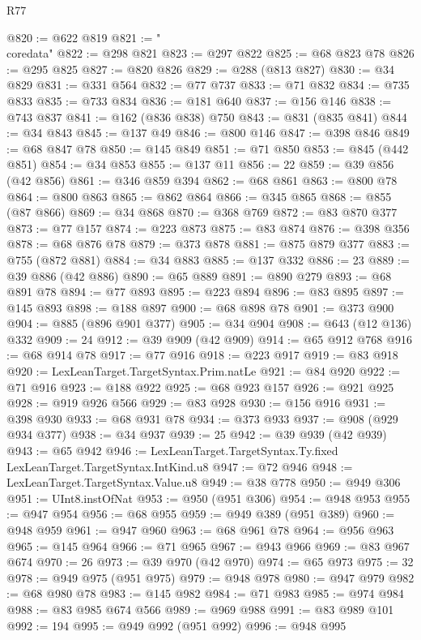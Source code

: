 \begin{lexlean}{R77}
\begin{coremodule}
{{@820 := @622 @819
@821 := "\\coredata"
@822 := @298 @821
@823 := @297 @822
@825 := @68 @823 @78
@826 := @295 @825
@827 := @820 @826
@829 := @288 (@813 @827)
@830 := @34 @829
@831 := @331 @564
@832 := @77 @737
@833 := @71 @832
@834 := @735 @833
@835 := @733 @834
@836 := @181 @640
@837 := @156 @146
@838 := @743 @837
@841 := @162 (@836 @838) @750
@843 := @831 (@835 @841)
@844 := @34 @843
@845 := @137 @49
@846 := @800 @146
@847 := @398 @846
@849 := @68 @847 @78
@850 := @145 @849
@851 := @71 @850
@853 := @845 (@442 @851)
@854 := @34 @853
@855 := @137 @11
@856 := 22
@859 := @39 @856 (@42 @856)
@861 := @346 @859 @394
@862 := @68 @861
@863 := @800 @78
@864 := @800 @863
@865 := @862 @864
@866 := @345 @865
@868 := @855 (@87 @866)
@869 := @34 @868
@870 := @368 @769
@872 := @83 @870 @377
@873 := @77 @157
@874 := @223 @873
@875 := @83 @874
@876 := @398 @356
@878 := @68 @876 @78
@879 := @373 @878
@881 := @875 @879 @377
@883 := @755 (@872 @881)
@884 := @34 @883
@885 := @137 @332
@886 := 23
@889 := @39 @886 (@42 @886)
@890 := @65 @889
@891 := @890 @279
@893 := @68 @891 @78
@894 := @77 @893
@895 := @223 @894
@896 := @83 @895
@897 := @145 @893
@898 := @188 @897
@900 := @68 @898 @78
@901 := @373 @900
@904 := @885 (@896 @901 @377)
@905 := @34 @904
@908 := @643 (@12 @136) @332
@909 := 24
@912 := @39 @909 (@42 @909)
@914 := @65 @912 @768
@916 := @68 @914 @78
@917 := @77 @916
@918 := @223 @917
@919 := @83 @918
@920 := LexLeanTarget.TargetSyntax.Prim.natLe
@921 := @84 @920
@922 := @71 @916
@923 := @188 @922
@925 := @68 @923 @157
@926 := @921 @925
@928 := @919 @926 @566
@929 := @83 @928
@930 := @156 @916
@931 := @398 @930
@933 := @68 @931 @78
@934 := @373 @933
@937 := @908 (@929 @934 @377)
@938 := @34 @937
@939 := 25
@942 := @39 @939 (@42 @939)
@943 := @65 @942
@946 := LexLeanTarget.TargetSyntax.Ty.fixed LexLeanTarget.TargetSyntax.IntKind.u8
@947 := @72 @946
@948 := LexLeanTarget.TargetSyntax.Value.u8
@949 := @38 @778
@950 := @949 @306
@951 := UInt8.instOfNat
@953 := @950 (@951 @306)
@954 := @948 @953
@955 := @947 @954
@956 := @68 @955
@959 := @949 @389 (@951 @389)
@960 := @948 @959
@961 := @947 @960
@963 := @68 @961 @78
@964 := @956 @963
@965 := @145 @964
@966 := @71 @965
@967 := @943 @966
@969 := @83 @967 @674
@970 := 26
@973 := @39 @970 (@42 @970)
@974 := @65 @973
@975 := 32
@978 := @949 @975 (@951 @975)
@979 := @948 @978
@980 := @947 @979
@982 := @68 @980 @78
@983 := @145 @982
@984 := @71 @983
@985 := @974 @984
@988 := @83 @985 @674 @566
@989 := @969 @988
@991 := @83 @989 @101
@992 := 194
@995 := @949 @992 (@951 @992)
@996 := @948 @995
}}
\end{coremodule}
\end{lexlean}
